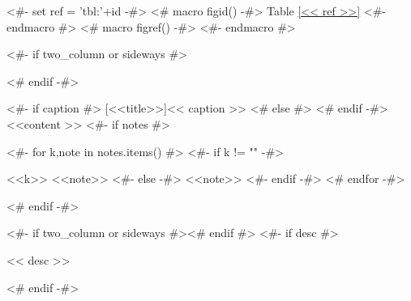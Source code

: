 <#- set ref = 'tbl:'+id -#>
<# macro figid() -#>
Table \ref{<< ref >>}
<#- endmacro #>
<# macro figref() -#>
\color{light-gray}
<#- endmacro #>

\begin{samepage}
\nopagebreak
<#- if two_column or sideways #>
\begin{adjustbox}{width=\textwidth,center}
<# endif -#>
\begin{threeparttable}
  <#- if caption #>
  [<<title>>]{<< caption >>}
  <# else #>
  <# endif -#>\label{<< ref >>}
  <<content >>
  <#- if notes #>
  \begin{tablenotes}
    <#- for k,note in notes.items() #>
    <#- if k != "" -#>
    \item [<<k>>] <<note>>
    <#- else -#>
    <<note>>
    <#- endif -#>
    <# endfor -#>
  \end{tablenotes}
  <# endif -#>
\end{threeparttable}
<#- if two_column or sideways #>\end{adjustbox}<# endif #>
<#- if desc #>
\nopagebreak
\begin{figinfo}<< desc >>\end{figinfo}
<# endif -#>
\end{samepage}
\pagebreak


